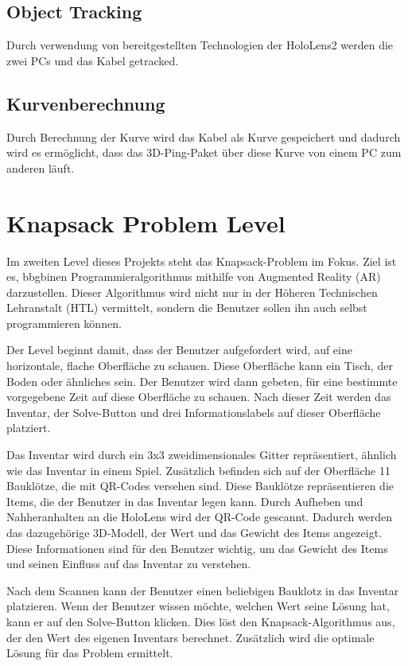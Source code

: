 \subsection{Object Tracking}
Durch verwendung von bereitgestellten Technologien der HoloLens2
werden die zwei PCs und das Kabel getracked.

\subsection{Kurvenberechnung}
Durch Berechnung der Kurve wird das Kabel als Kurve gespeichert
und dadurch wird es ermöglicht, dass das 3D-Ping-Paket über diese
Kurve von einem PC zum anderen läuft.

\section{Knapsack Problem Level}
Im zweiten Level dieses Projekts steht das Knapsack-Problem im Fokus.
Ziel ist es, bbgbinen Programmieralgorithmus mithilfe von Augmented Reality
(AR) darzustellen. Dieser Algorithmus wird nicht nur in der Höheren
Technischen Lehranstalt (HTL) vermittelt, sondern die Benutzer sollen
ihn auch selbst programmieren können.

Der Level beginnt damit, dass der Benutzer aufgefordert wird, auf eine
horizontale, flache Oberfläche zu schauen. Diese Oberfläche kann ein Tisch,
der Boden oder ähnliches sein. Der Benutzer wird dann gebeten, für eine bestimmte
vorgegebene Zeit auf diese Oberfläche zu schauen. Nach dieser Zeit werden das Inventar,
der Solve-Button und drei Informationslabels auf dieser Oberfläche platziert.

Das Inventar wird durch ein 3x3 zweidimensionales Gitter repräsentiert, ähnlich
wie das Inventar in einem Spiel. Zusätzlich befinden sich auf der Oberfläche 11 Bauklötze,
die mit QR-Codes versehen sind. Diese Bauklötze repräsentieren die Items, die der Benutzer
in das Inventar legen kann. Durch Aufheben und Nahheranhalten an die HoloLens wird der QR-Code gescannt.
Dadurch werden das dazugehörige 3D-Modell, der Wert und das Gewicht des Items angezeigt.
Diese Informationen sind für den Benutzer wichtig, um das Gewicht des Items und
seinen Einfluss auf das Inventar zu verstehen.

Nach dem Scannen kann der Benutzer einen beliebigen Bauklotz in das Inventar platzieren.
Wenn der Benutzer wissen möchte, welchen Wert seine Lösung hat, kann er auf den Solve-Button
klicken. Dies löst den Knapsack-Algorithmus aus, der den Wert des eigenen Inventars berechnet.
Zusätzlich wird die optimale Lösung für das Problem ermittelt.

